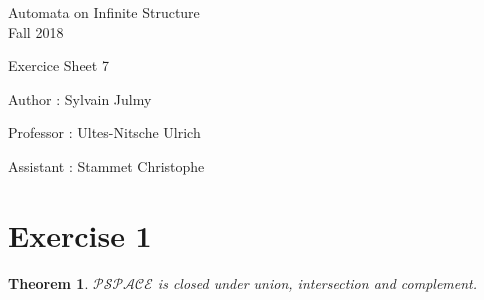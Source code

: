 \documentclass[a4paper,11pt]{report}
\author{Sylvain Julmy}
\date{\today}
\newtheorem*{thm}{Theorem}
\begin{document}
\begin{center}
  \Large{
    Automata on Infinite Structure\\
    Fall 2018
  }
  
  \noindent\makebox[\linewidth]{\rule{\linewidth}{0.4pt}}
  Exercice Sheet 7

  \vspace*{1.4cm}

  Author : Sylvain Julmy
  \noindent\makebox[\linewidth]{\rule{\linewidth}{0.4pt}}

  \begin{flushleft}
    Professor : Ultes-Nitsche Ulrich
    
    Assistant : Stammet Christophe
  \end{flushleft}

  \noindent\makebox[\linewidth]{\rule{\textwidth}{1pt}}
\end{center}

\section*{Exercise 1}

\begin{thm}
  $\mathcal{PSPACE}$ is closed under union, intersection and complement.
\end{thm}
\end{document}

